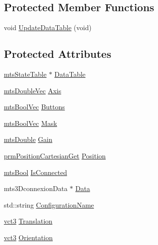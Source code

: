 \subsection*{Protected Member Functions}
\begin{DoxyCompactItemize}
\item 
void \hyperlink{classmts3_dconnexion_a58d9df19ed8b33d6daadc588ceffacb3}{Update\-Data\-Table} (void)
\end{DoxyCompactItemize}
\subsection*{Protected Attributes}
\begin{DoxyCompactItemize}
\item 
\hyperlink{classmts_state_table}{mts\-State\-Table} $\ast$ \hyperlink{classmts3_dconnexion_a297dbc803c7b296a06d90b59d6c2cd3e}{Data\-Table}
\item 
\hyperlink{mts_vector_8h_af69167a5dc2ad33eb93965b9387d8403}{mts\-Double\-Vec} \hyperlink{classmts3_dconnexion_aef658870f656a1ccb93a065d74d74e4b}{Axis}
\item 
\hyperlink{mts_vector_8h_a11c0cbf286b972226b08510c6ba92e67}{mts\-Bool\-Vec} \hyperlink{classmts3_dconnexion_a8fc19fc124985d015c53b9580ca7355f}{Buttons}
\item 
\hyperlink{mts_vector_8h_a11c0cbf286b972226b08510c6ba92e67}{mts\-Bool\-Vec} \hyperlink{classmts3_dconnexion_a9aa79512dbed22a9c69d56ec7e757791}{Mask}
\item 
\hyperlink{mts_generic_object_proxy_8h_a31e76b0190a8d3f9838626cd7b47bd75}{mts\-Double} \hyperlink{classmts3_dconnexion_a790ed1fc6b5a64b4a1d022a541c3ae90}{Gain}
\item 
\hyperlink{classprm_position_cartesian_get}{prm\-Position\-Cartesian\-Get} \hyperlink{classmts3_dconnexion_a18477fb46941bead7c9c998aa4f64cae}{Position}
\item 
\hyperlink{mts_generic_object_proxy_8h_ae2e26261f1874d4aa4ee374ece7646bd}{mts\-Bool} \hyperlink{classmts3_dconnexion_a7242b5dd56fed7c290e054fe129e2c00}{Is\-Connected}
\item 
mts3\-Dconnexion\-Data $\ast$ \hyperlink{classmts3_dconnexion_af6ca74b9b8dd0a73f56cc7d0eab06fc4}{Data}
\item 
std\-::string \hyperlink{classmts3_dconnexion_af68f59f690ccf2fd198b90eedae0e769}{Configuration\-Name}
\item 
\hyperlink{vct_fixed_size_vector_types_8h_a3af82acdbf4eeb73c551909240b106ea}{vct3} \hyperlink{classmts3_dconnexion_a8e84db133cf3e6f2624b231a05e049bf}{Translation}
\item 
\hyperlink{vct_fixed_size_vector_types_8h_a3af82acdbf4eeb73c551909240b106ea}{vct3} \hyperlink{classmts3_dconnexion_afff4aa6e11a99251eaf021e9bba2047c}{Orientation}
\end{DoxyCompactItemize}
